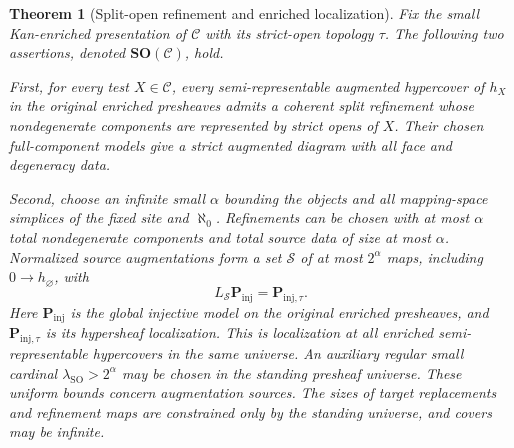 \documentclass[12pt]{amsart}
\newtheorem{thm}{Theorem}[section]
\theoremstyle{definition}
\theoremstyle{remark}
\numberwithin{equation}{section}
\begin{document}
\begin{thm}[Split-open refinement and enriched localization]
Fix the small Kan-enriched presentation of $\mathcal C$
with its strict-open topology $\tau$.
\label{lem:banach-hypercover-refinement}
The following two assertions, denoted
$\mathbf{SO}(\mathcal C)$, hold.

First, for every test $X\in\mathcal C$, every
semi-representable augmented hypercover of $h_X$
in the original enriched presheaves admits
a coherent split refinement whose nondegenerate
components are represented by strict opens of $X$.
Their chosen full-component models give a strict
augmented diagram with all face and degeneracy data.

Second, choose an infinite small $\alpha$ bounding
the objects and all mapping-space simplices of the
fixed site and $\aleph_0$. Refinements can be chosen
with at most $\alpha$ total nondegenerate components
and total source data of size at most $\alpha$.
Normalized source augmentations form a set
$\mathscr S$ of at most $2^\alpha$ maps, including
$0\to h_\varnothing$, with
\[
 L_{\mathscr S}\mathbf P_{\mathrm{inj}}
       =\mathbf P_{\mathrm{inj},\tau}.
\]
Here $\mathbf P_{\mathrm{inj}}$ is the global injective
model on the original enriched presheaves, and
$\mathbf P_{\mathrm{inj},\tau}$ is its hypersheaf localization.
This is localization at all enriched semi-representable
hypercovers in the same universe. An auxiliary regular small
cardinal $\lambda_{\mathrm{SO}}>2^\alpha$ may be chosen
in the standing presheaf universe. These uniform bounds
concern augmentation sources. The sizes of target
replacements and refinement maps are constrained only
by the standing universe, and covers may be infinite.
\end{thm}
\end{document}
